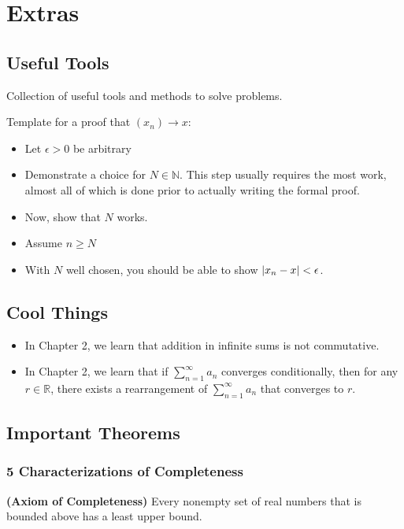 \appendix
\chapter{Extras}
\section{Useful Tools}

Collection of useful tools and methods to solve problems.

\begin{tip}
  Template for a proof that $(x_n) \rightarrow x$:
  \begin{itemize}
    \item Let $\epsilon > 0$ be arbitrary 
    \item Demonstrate a choice for $N \in \mathbb{N}$. 
    This step usually requires the most work, almost all of
    which is done prior to actually writing the formal proof.
    \item Now, show that $N$ works.
    \item Assume $n \geq N$
    \item With $N$ well chosen,  you should be able to show $\abs{x_n - x} < \epsilon$.
  \end{itemize}
\end{tip}

\section{Cool Things}
\begin{itemize}
  \item In Chapter 2, we learn that addition in infinite sums is not commutative.
  \item In Chapter 2, we learn that if $\sum_{n=1}^\infty a_n$ converges conditionally, then 
  for any $r \in \mathbb{R}$, there exists a rearrangement of $\sum_{n=1}^\infty a_n$ that converges to $r$.
\end{itemize}

\section{Important Theorems}
\subsection{5 Characterizations of Completeness}
\begin{theorem}
  \textbf{\textup{(Axiom of Completeness)}}
  Every nonempty set of real numbers that is bounded above has a least upper bound. 
\end{theorem}

